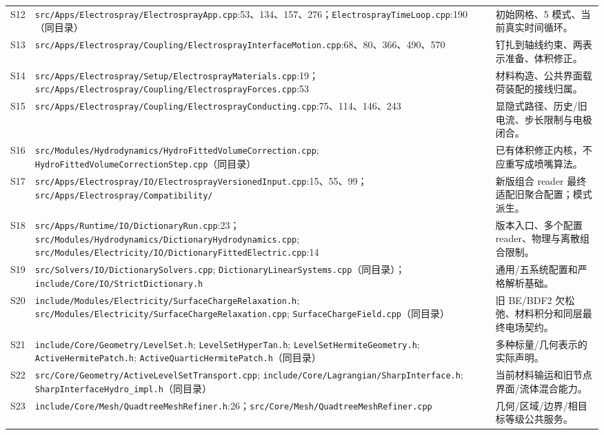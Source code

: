 \documentclass[UTF8,a4paper,11pt,fontset=fandol]{ctexart}
\numberwithin{equation}{section}
\newcommand{\code}[1]{\nolinkurl{#1}}
\begin{document}
\begin{longtable}{@{}P{.07\textwidth}P{.60\textwidth}P{.26\textwidth}@{}}
S12 & \code{src/Apps/Electrospray/ElectrosprayApp.cpp}:53、134、157、276；\code{ElectrosprayTimeLoop.cpp}:190（同目录） & 初始网格、5 模式、当前真实时间循环。\\
S13 & \code{src/Apps/Electrospray/Coupling/ElectrosprayInterfaceMotion.cpp}:68、80、366、490、570 & 钉扎到轴线约束、两表示准备、体积修正。\\
S14 & \code{src/Apps/Electrospray/Setup/ElectrosprayMaterials.cpp}:19；\code{src/Apps/Electrospray/Coupling/ElectrosprayForces.cpp}:53 & 材料构造、公共界面载荷装配的接线归属。\\
S15 & \code{src/Apps/Electrospray/Coupling/ElectrosprayConducting.cpp}:75、114、146、243 & 显隐式路径、历史/旧电流、步长限制与电极闭合。\\
S16 & \code{src/Modules/Hydrodynamics/HydroFittedVolumeCorrection.cpp}; \code{HydroFittedVolumeCorrectionStep.cpp}（同目录） & 已有体积修正内核，不应重写成喷嘴算法。\\
S17 & \code{src/Apps/Electrospray/IO/ElectrosprayVersionedInput.cpp}:15、55、99；\code{src/Apps/Electrospray/Compatibility/} & 新版组合 reader 最终适配旧聚合配置；模式派生。\\
S18 & \code{src/Apps/Runtime/IO/DictionaryRun.cpp}:23；\code{src/Modules/Hydrodynamics/DictionaryHydrodynamics.cpp}; \code{src/Modules/Electricity/IO/DictionaryFittedElectric.cpp}:14 & 版本入口、多个配置 reader、物理与离散组合限制。\\
S19 & \code{src/Solvers/IO/DictionarySolvers.cpp}; \code{DictionaryLinearSystems.cpp}（同目录）；\code{include/Core/IO/StrictDictionary.h} & 通用/五系统配置和严格解析基础。\\
S20 & \code{include/Modules/Electricity/SurfaceChargeRelaxation.h}; \code{src/Modules/Electricity/SurfaceChargeRelaxation.cpp}; \code{SurfaceChargeField.cpp}（同目录） & 旧 BE/BDF2 欠松弛、材料积分和同层最终电场契约。\\
S21 & \code{include/Core/Geometry/LevelSet.h}; \code{LevelSetHyperTan.h}; \code{LevelSetHermiteGeometry.h}; \code{ActiveHermitePatch.h}; \code{ActiveQuarticHermitePatch.h}（同目录） & 多种标量/几何表示的实际声明。\\
S22 & \code{src/Core/Geometry/ActiveLevelSetTransport.cpp}; \code{include/Core/Lagrangian/SharpInterface.h}; \code{SharpInterfaceHydro_impl.h}（同目录） & 当前材料输运和旧节点界面/流体混合能力。\\
S23 & \code{include/Core/Mesh/QuadtreeMeshRefiner.h}:26；\code{src/Core/Mesh/QuadtreeMeshRefiner.cpp} & 几何/区域/边界/相目标等级公共服务。\\

\end{longtable}
\end{document}
